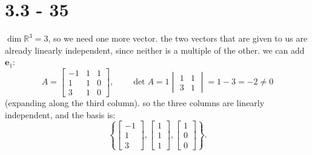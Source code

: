 \documentclass{article}
\begin{document}
\section*{3.3 - 35}

$\dim \mathbb{R}^3 = 3$, so we need one more vector. the two vectors that are given to us are
already linearly independent, since neither is a multiple of the other. we can add
$\mathbf{e}_1$:
\[
A = \begin{bmatrix} -1 & 1 & 1 \\ 1 & 1 & 0 \\ 3 & 1 & 0 \end{bmatrix},
\qquad
\det A = 1\begin{vmatrix} 1 & 1 \\ 3 & 1 \end{vmatrix} = 1 - 3 = -2 \neq 0
\]
(expanding along the third column). so the three columns are linearly
independent, and the basis is:
\[
\left\{
\begin{bmatrix} -1 \\ 1 \\ 3 \end{bmatrix},
\begin{bmatrix} 1 \\ 1 \\ 1 \end{bmatrix},
\begin{bmatrix} 1 \\ 0 \\ 0 \end{bmatrix}
\right\}.
\]
\end{document}
